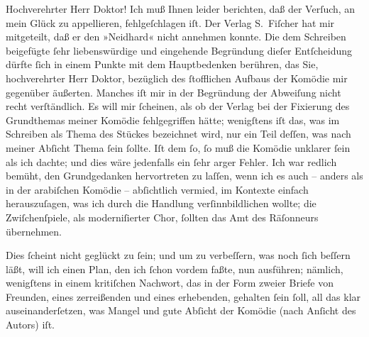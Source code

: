 \pstart{}Hochverehrter Herr Doktor!\pend\vspace{0.5em}
\pstart
           Ich muß Ihnen leider berichten, daß der Verſuch, an mein Glück zu appellieren,
               fehlgeſchlagen iſt. Der Verlag S. Fiſcher hat mir
               mitgeteilt, daß er den »Neidhard« nicht annehmen
               konnte. Die dem Schreiben beigefügte{ }ſehr liebenswürdige und eingehende Begründung
               dieſer Entſcheidung dürfte{ }ſich in einem Punkte mit dem Hauptbedenken berühren, das
               Sie, hochverehrter Herr Doktor, {\pb}bezüglich des{ }ſtofflichen Aufbaus der Komödie mir gegenüber äußerten. Manches iſt mir in der
               Begründung der Abweiſung nicht recht verſtändlich. Es will mir{ }ſcheinen, als ob der
               Verlag bei der Fixierung des Grundthemas meiner Komödie fehlgegriffen hätte;
               wenigſtens iſt das, was im Schreiben als Thema des Stückes bezeichnet wird, nur ein
               Teil deſſen, was nach meiner Abſicht Thema{ }ſein{ }ſollte. Iſt dem{ }ſo,{ }ſo muß die
               Komödie unklarer{ }ſein als ich dachte; und dies wäre jedenfalls ein{ }ſehr arger Fehler.
               Ich war redlich bemüht, den Grundgedanken hervortreten zu laſſen, {\pb}wenn ich es auch – anders als in der arabiſchen Komödie – abſichtlich vermied,
               im Kontexte einfach herauszuſagen, was ich durch die Handlung verſinnbildlichen
               wollte; die Zwiſchenſpiele, als moderniſierter Chor,{ }ſollten das Amt des Räſonneurs
               übernehmen.\pend
           
\pstart
           Dies{ }ſcheint nicht geglückt zu{ }ſein; und um zu verbeſſern, was noch{ }ſich beſſern
               läßt, will ich einen Plan, den ich{ }ſchon vordem faßte, nun ausführen; nämlich,
               wenigſtens in einem kritiſchen Nachwort, das in der Form zweier Briefe von Freunden,
               eines zerreißenden und eines erhebenden, {\pb}gehalten{ }ſein{ }ſoll, all das klar auseinanderſetzen, was Mangel und gute Abſicht der Komödie
               (nach Anſicht des Autors) iſt.\pend
           
